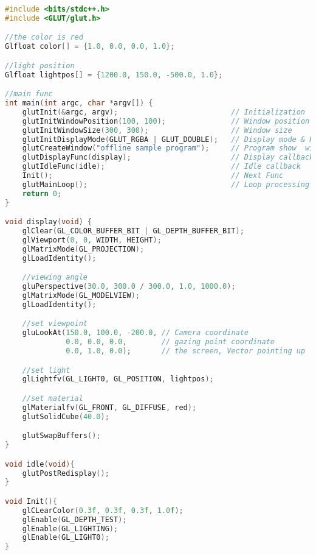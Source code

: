 \documentclass[12pt,a4paper]{jsarticle}
\begin{document}
\begin{lstlisting}[language=C++]
#include <bits/stdc++.h>
#include <GLUT/glut.h>

//the color is red
Glfloat color[] = {1.0, 0.0, 0.0, 1.0};

//light position
Glfloat lightpos[] = {1200.0, 150.0, -500.0, 1.0};

//main func
int main(int argc, char *argv[]) {
    glutInit(&argc, argv);                          // Initialization
    glutInitWindowPosition(100, 100);               // Window position
    glutInitWindowSize(300, 300);                   // Window size
    glutInitDisplayMode(GLUT_RGBA | GLUT_DOUBLE);   // Display mode & RGBA mode & doube buffer mode
    glutCreateWindow("offline sample program");     // Program show  windowname
    glutDisplayFunc(display);                       // Display callback
    glutIdleFunc(idle);                             // Idle callback
    Init();                                         // Next Func
    glutMainLoop();                                 // Loop processing
    return 0;
}

void display(void) {
    glClear(GL_COLOR_BUFFER_BIT | GL_DEPTH_BUFFER_BIT);
    glViewport(0, 0, WIDTH, HEIGHT); 
    glMatrixMode(GL_PROJECTION);
    glLoadIdentity();

    //viewing angle
    gluPerspective(30.0, 300.0 / 300.0, 1.0, 1000.0);
    glMatrixMode(GL_MODELVIEW);
    glLoadIdentity();

    //set viewpoint
    gluLookAt(150.0, 100.0, -200.0, // Camera coordinate
              0.0, 0.0, 0.0,        // gazing point coordinate
              0.0, 1.0, 0.0);       // the screen, Vector pointing up 

    //set light
    glLightfv(GL_LIGHT0, GL_POSITION, lightpos);

    //set material
    glMaterialfv(GL_FRONT, GL_DIFFUSE, red);
    glutSolidCube(40.0);

    glutSwapBuffers();
}

void idle(void){
    glutPostRedisplay();
}

void Init(){
    glCLearColor(0.3f, 0.3f, 0.3f, 1.0f);
    glEnable(GL_DEPTH_TEST);
    glEnable(GL_LIGHTING);
    glEnable(GL_LIGHT0);
}
\end{lstlisting}
\end{document}
